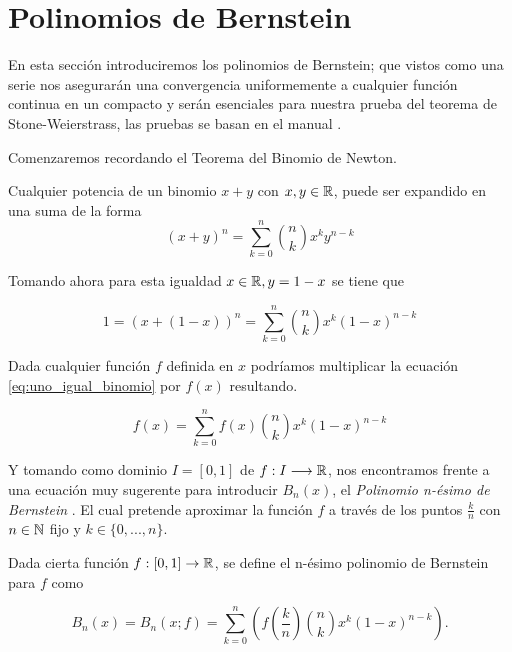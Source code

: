 %

\section{Polinomios de Bernstein}\label{ch:Bernstein}  

En esta sección introduciremos los polinomios de Bernstein;   
que vistos como una serie nos asegurarán una convergencia uniformemente a cualquier 
función continua en un compacto y serán esenciales para nuestra prueba del teorema de Stone-Weierstrass, 
las pruebas se basan en el manual \cite{the-elements-of-real-analysis}.  

Comenzaremos recordando el Teorema del Binomio de Newton. 


\begin{teorema}
    Cualquier potencia de un binomio $x+y$ con $x,y \in \mathbb{R}$,  puede ser expandido en una suma de la forma
    \[(x+y)^n = \sum_{k=0}^n \binom{n}{k} x^{k}y^{n-k}\]
\end{teorema}  

Tomando ahora para esta igualdad $x \in \mathbb{R}, y= 1-x$ se tiene que 

\begin{equation}\label{eq:uno_igual_binomio}
    1 = (x+ (1-x))^n = \sum_{k=0}^n \binom{n}{k} x^{k} (1-x)^{n-k}
\end{equation}

Dada cualquier función $f$ definida en $x$ podríamos multiplicar la ecuación 
\eqref{eq:uno_igual_binomio} por $f(x)$ resultando. 

\begin{equation}\label{eq:f_igual_binomio}
    f(x) = \sum_{k=0}^n f(x) \binom{n}{k} x^{k} (1-x)^{n-k}
\end{equation} 

Y tomando como dominio $I=[0,1]$ de $f: I \longrightarrow \mathbb{R}$,
 nos encontramos
frente a una ecuación muy sugerente para introducir $B_n(x)$, el \textit{Polinomio n-ésimo  de Bernstein }. 
El cual pretende  aproximar la función $f$ a través de los puntos $\frac{k}{n}$ con $n \in \mathbb{N}$ fijo
y $k \in \{0,...,n \}.$

\begin{definicion} \label{def:Bernstein}
    Dada cierta función $f: [0,1] \rightarrow \mathbb{R}$, se define el n-ésimo polinomio de Bernstein para $f$ como 

    $$B_n(x) = B_n(x;f)=\sum_ {k=0}^{n} \left( f \left( \frac{k}{n} \right) \binom{n}{k} x^k (1-x)^{n-k} \right) .$$

\end{definicion}

